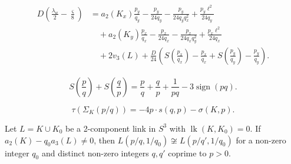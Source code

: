 \documentclass[10pt,a4paper]{amsart}
\newcommand{\lk}{\mathop{\mathrm{lk}}\nolimits}
\newcommand{\sign}{\mathop{\mathrm{sign}}\nolimits}
\begin{document}
\begin{align}\label{eq:Ito}
\begin{split}
D \left(\frac{\lambda_w}{2}-\frac{\varsigma}{8}\right) &= a_2(K_x)\frac{p_y}{q_y}-\frac{p_y}{24q_y} -\frac{p_y}{24q_yq_x^2} +\frac{p_y\ell^2}{24q_y}\\
&\quad +a_2(K_y)\frac{p_x}{q_x} -\frac{p_x}{24q_x}-\frac{p_x}{24q_xq_y^2}+\frac{p_x\ell^2}{24q_x}\\
&\quad + 2v_3(L) + \frac{D}{24}\left( S\left(\frac{p_x}{q_x}\right)-\frac{p_x}{q_x} +S\left(\frac{p_y}{q_y}\right)-\frac{p_y}{q_y} \right).
\end{split}
\end{align}

\begin{equation}\label{eq:DedekindSymbol}
    S\left(\frac{p}{q}\right) + S\left(\frac{q}{p}\right) = 
\frac{p}{q} + \frac{q}{p} + \frac{1}{pq} - 3 \sign (p q).
\end{equation}

\begin{equation}\label{CGformula}
\tau(\Sigma_{K}(p/ q)) = -4p \cdot s(q,p) - \sigma(K,p).
\end{equation}

\begin{theorem}
    Let $L = K \cup K_0$ be a 2-component link in $S^3$ with $\lk(K,K_0)=0$. 
    If $a_2 (K) - q_0 a_3(L) \ne 0$, then $L(p/q,1/q_0) \not\cong L(p/q', 1/q_0)$ for a non-zero integer $q_0$ and distinct non-zero integers $q, q'$ coprime to $p>0$. 
\end{theorem}
\end{document}
